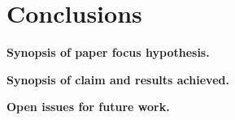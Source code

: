 \section{Conclusions}
\label{sec:conclusions}

\textbf{Synopsis of paper focus hypothesis.}

\textbf{Synopsis of claim and results achieved.}

\textbf{Open issues for future work.}
